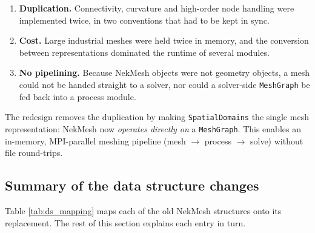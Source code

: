 \begin{enumerate}
  \item \textbf{Duplication.} Connectivity, curvature and
    high-order node handling were implemented twice, in two
    conventions that had to be kept in sync.
  \item \textbf{Cost.} Large industrial meshes were held twice in
    memory, and the conversion between representations dominated the
    runtime of several modules.
  \item \textbf{No pipelining.} Because NekMesh objects were not
    geometry objects, a mesh could not be handed straight to a solver,
    nor could a solver-side \texttt{MeshGraph} be fed back into a
    process module.
\end{enumerate}

The redesign removes the duplication by making
\texttt{SpatialDomains} the single mesh representation: NekMesh now
\textit{operates directly on} a \texttt{MeshGraph}. This enables an
in-memory, MPI-parallel meshing pipeline (mesh $\rightarrow$ process
$\rightarrow$ solve) without file round-trips.

\subsection{Summary of the data structure changes}
\label{sect:ds_summary}
Table \ref{tab:ds_mapping} maps each of the old NekMesh structures onto
its replacement. The rest of this section explains each entry in turn.

